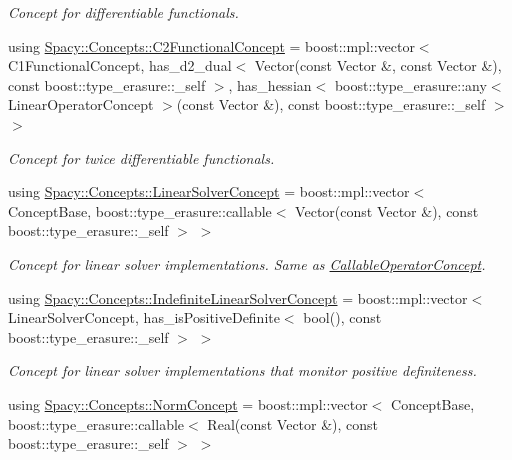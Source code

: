 \begin{DoxyCompactItemize}
\begin{DoxyCompactList}\small\item\em Concept for differentiable functionals. \end{DoxyCompactList}\item 
using \hyperlink{group__ConceptGroup_gafb4414561b07b27100cad81ecf152e47_gafb4414561b07b27100cad81ecf152e47}{Spacy\+::\+Concepts\+::\+C2\+Functional\+Concept} = boost\+::mpl\+::vector$<$ C1\+Functional\+Concept, has\+\_\+d2\+\_\+dual$<$ Vector(const Vector \&, const Vector \&), const boost\+::type\+\_\+erasure\+::\+\_\+self $>$, has\+\_\+hessian$<$ boost\+::type\+\_\+erasure\+::any$<$ Linear\+Operator\+Concept $>$(const Vector \&), const boost\+::type\+\_\+erasure\+::\+\_\+self $>$ $>$
\begin{DoxyCompactList}\small\item\em Concept for twice differentiable functionals. \end{DoxyCompactList}\item 
using \hyperlink{group__ConceptGroup_gac7d6a94c7131c8613e2ab26fddeb50bd_gac7d6a94c7131c8613e2ab26fddeb50bd}{Spacy\+::\+Concepts\+::\+Linear\+Solver\+Concept} = boost\+::mpl\+::vector$<$ Concept\+Base, boost\+::type\+\_\+erasure\+::callable$<$ Vector(const Vector \&), const boost\+::type\+\_\+erasure\+::\+\_\+self $>$ $>$
\begin{DoxyCompactList}\small\item\em Concept for linear solver implementations. Same as \hyperlink{group__ConceptGroup_gadec0c664abaacc2065dadd8b11cc8d30_CallableOperatorConceptAnchor}{Callable\+Operator\+Concept}. \end{DoxyCompactList}\item 
using \hyperlink{group__ConceptGroup_ga582dd34334cdecc7b27883f4e8239490_ga582dd34334cdecc7b27883f4e8239490}{Spacy\+::\+Concepts\+::\+Indefinite\+Linear\+Solver\+Concept} = boost\+::mpl\+::vector$<$ Linear\+Solver\+Concept, has\+\_\+is\+Positive\+Definite$<$ bool(), const boost\+::type\+\_\+erasure\+::\+\_\+self $>$ $>$
\begin{DoxyCompactList}\small\item\em Concept for linear solver implementations that monitor positive definiteness. \end{DoxyCompactList}\item 
using \hyperlink{group__ConceptGroup_ga8b6032c46f6e31840a2c956c6360549b_ga8b6032c46f6e31840a2c956c6360549b}{Spacy\+::\+Concepts\+::\+Norm\+Concept} = boost\+::mpl\+::vector$<$ Concept\+Base, boost\+::type\+\_\+erasure\+::callable$<$ Real(const Vector \&), const boost\+::type\+\_\+erasure\+::\+\_\+self $>$ $>$

\end{DoxyCompactItemize}
